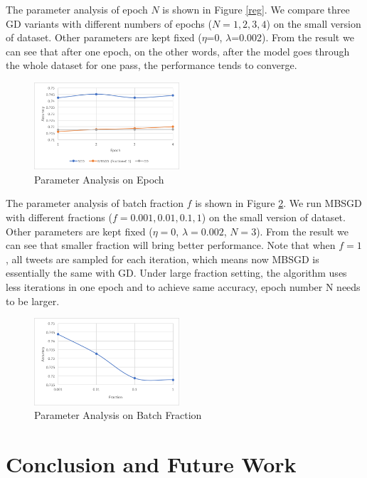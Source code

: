 \documentclass[sigconf]{acmart}
\begin{document}
The parameter analysis of epoch $N$ is shown in Figure \ref{reg}. We compare three GD variants with different numbers of epochs ($N = 1, 2, 3, 4$) on the small version of dataset. Other parameters are kept fixed ($\eta$=0, $\lambda$=0.002). From the result we can see that after one epoch, on the other words, after the model goes through the whole dataset for one pass, the performance tends to converge.

\begin{figure}[t]
\centering
\includegraphics[width=0.48\textwidth]{epoch.png}
\caption{Parameter Analysis on Epoch}
\label{epoch}
\end{figure}

The parameter analysis of batch fraction $f$ is shown in Figure \ref{frac}. We run MBSGD with different fractions ($f = 0.001, 0.01, 0.1, 1$) on the small version of dataset. Other parameters are kept fixed ($\eta = 0$, $\lambda = 0.002$, $N = 3$). From the result we can see that smaller fraction will bring better performance. Note that when $f = 1$, all tweets are sampled for each iteration, which means now MBSGD is essentially the same with GD. Under large fraction setting, the algorithm uses less iterations in one epoch and to achieve same accuracy, epoch number N needs to be larger. 

\begin{figure}[t]
\centering
\includegraphics[width=0.48\textwidth]{fraction.png}
\caption{Parameter Analysis on Batch Fraction}
\label{frac}
\end{figure}



\section{Conclusion and Future Work}
\label{sec:conclusionAndFutureWork}
\end{document}
